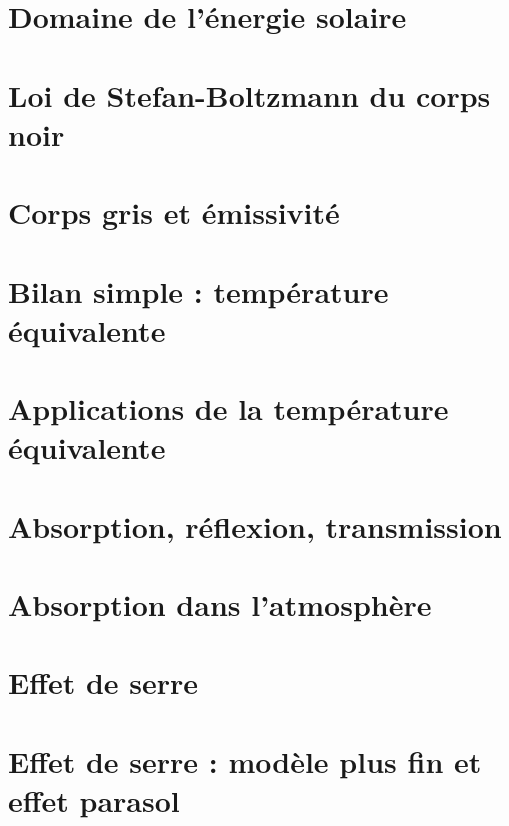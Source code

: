 \documentclass[
	a4paper,
	DIV16,
	10pt]{scrartcl}
\begin{document}
\newpage
\section{Domaine de l'énergie solaire}


\newpage
\section{Loi de Stefan-Boltzmann du corps noir}


\newpage
\section{Corps gris et émissivité}


\newpage
\section{Bilan simple : température équivalente}



\newpage
\section{Applications de la température équivalente}


\newpage
\section{Absorption, réflexion, transmission}



\newpage
\section{Absorption dans l'atmosphère}



\newpage
\section{Effet de serre}


\newpage
\section{Effet de serre : modèle plus fin et effet parasol}

\end{document}
